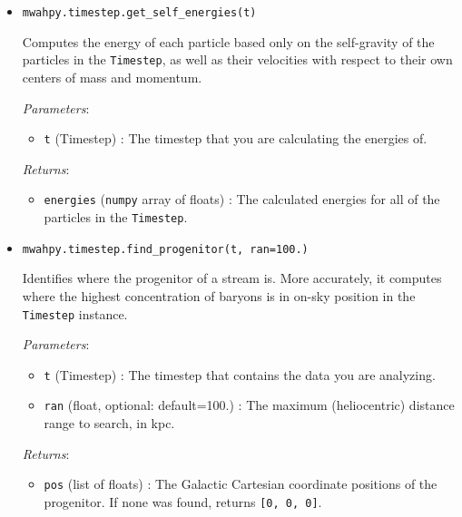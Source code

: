 \documentclass{article}
\begin{document}
\begin{itemize}



\item \verb!mwahpy.timestep.get_self_energies(t)!

Computes the energy of each particle based only on the self-gravity of the particles in the \verb!Timestep!, as well as their velocities with respect to their own centers of mass and momentum.  

\textit{Parameters}: \begin{itemize}

\item \verb!t! (Timestep) : The timestep that you are calculating the energies of. 

\end{itemize}

\textit{Returns}: \begin{itemize}

\item \verb!energies! (\verb!numpy! array of floats) : The calculated energies for all of the particles in the \verb!Timestep!.

\end{itemize}



\item \verb!mwahpy.timestep.find_progenitor(t, ran=100.)!

Identifies where the progenitor of a stream is. More accurately, it computes where the highest concentration of baryons is in on-sky position in the \verb!Timestep! instance. 

\textit{Parameters}: \begin{itemize}

\item \verb!t! (Timestep) : The timestep that contains the data you are analyzing. 

\item \verb!ran! (float, optional: default=100.) : The maximum (heliocentric) distance range to search, in kpc.

\end{itemize}

\textit{Returns}: \begin{itemize}

\item \verb!pos! (list of floats) : The Galactic Cartesian coordinate positions of the progenitor. If none was found, returns \verb![0, 0, 0]!. 

\end{itemize}



\end{itemize}
\end{document}
